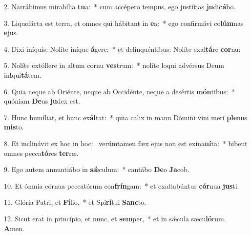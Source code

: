 2. Narrábimus mirabília \textbf{tu}a:~*  cum accépero tempus, ego justítias \textbf{ju}di\textbf{cá}bo.\

3. Liquefácta est terra, et omnes qui hábitant in \textbf{e}a:~*  ego confirmávi co\textbf{lúm}nas \textbf{e}jus.\

4. Dixi iníquis: Nolíte iníque \textbf{á}gere:~*  et delinquéntibus: Nolíte exal\textbf{tá}re \textbf{cor}nu:\

5. Nolíte extóllere in altum cornu \textbf{ves}trum:~*  nolíte loqui advérsus Deum in\textbf{i}qui\textbf{tá}tem.\

6. Quia neque ab Oriénte, neque ab Occidénte, neque a desértis \textbf{món}tibus:~*  quóniam \textbf{De}us \textbf{ju}dex est.\

7. Hunc humíliat, et hunc ex\textbf{ál}tat:~*  quia calix in manu Dómini vini meri \textbf{ple}nus \textbf{mis}to.\

8. Et inclinávit ex hoc in hoc: \dag\  verúmtamen fæx ejus non est exina\textbf{ní}ta:~*  bibent omnes pecca\textbf{tó}res \textbf{ter}ræ.\

9. Ego autem annuntiábo in \textbf{sǽ}culum:~*  cantábo \textbf{De}o \textbf{Ja}cob.\

10. Et ómnia córnua peccatórum con\textbf{frín}gam:~*  et exaltabúntur \textbf{cór}nua \textbf{jus}ti.\

11. Glória Patri, et \textbf{Fí}lio,~*  et Spi\textbf{rí}tui \textbf{Sanc}to.\

12. Sicut erat in princípio, et nunc, et \textbf{sem}per,~*  et in sǽcula sæcu\textbf{ló}rum. \textbf{A}men.\


